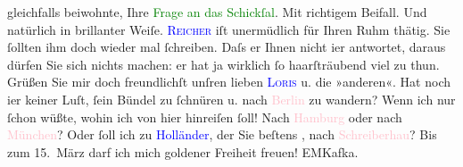                   gleichfalls beiwohnte, Ihre \textcolor{green}{Frage an das
                     Schickſal}{}\ledrightnote{\textcolor{green}{Die Frage an das Schicksal}}. Mit richtigem Beifall. Und natürlich in brillanter Weiſe. \textcolor{blue}{\textsc{Reicher}}{}\ledrightnote{\textcolor{blue}{Emanuel Reicher}} iſt unermüdlich für Ihren Ruhm thätig. Sie ſollten ihm doch wieder mal
                  ſchreiben. {\pb}Daſs er Ihnen nicht i{\geminationm}er antwortet, daraus dürfen Sie sich nichts machen:
                  er hat ja wirklich ſo haarſträubend viel zu thun.\pend
           \pstart
           Grüßen Sie mir doch freundlichſt unſren lieben \textsc{\textcolor{blue}{Loris}{}\ledrightnote{\textcolor{blue}{Hugo von Hofmannsthal}}} u. die »anderen«. Hat noch i{\geminationm}er keiner Luſt,
                  ſein Bündel zu ſchnüren u. nach \textcolor{pink}{Berlin}{}\ledrightnote{\textcolor{pink}{Berlin}} zu
                  wandern?\pend
           \pstart
           Wenn ich nur ſchon wüßte, wohin ich von hier hinreiſen ſoll! Nach \textcolor{pink}{Hamburg}{}\ledrightnote{\textcolor{pink}{Hamburg}} oder nach \textcolor{pink}{München}{}\ledrightnote{\textcolor{pink}{München}}? Oder ſoll ich zu \textcolor{blue}{Holländer}{}\ledrightnote{\textcolor{blue}{Felix Hollaender}},
                  der Sie beſtens \label{T_L00182_2v}\label{T_L00182_2h}, nach \textcolor{pink}{Schreiberhau}{}\ledrightnote{\textcolor{pink}{Szklarska Poręba}}? Bis zum 15. März darf
                  ich mich goldener Freiheit freuen!\pend
           \pstart
           \spacefill\mbox{EMKafka.}\pend
           \pstart
           \label{T_L00182_3v}\label{T_L00182_3h}\pend
           \endnumbering{}  
      
